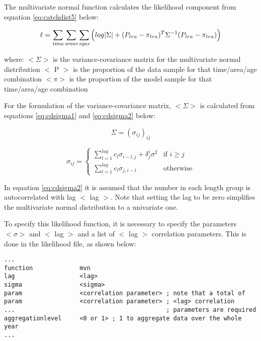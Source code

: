 \documentclass[]{book}
\begin{document}
The multivariate normal function calculates the likelihood component
from equation \eqref{eq:catchdist5} below:

\begin{equation}
\label{eq:catchdist5}
\ell = \sum_{\it time}\sum_{\it areas}\sum_{\it ages} \Big( log|\Sigma| + (P_{tra} - \pi_{tra})^T \Sigma^{-1}(P_{tra} - \pi_{tra}) \Big)\end{equation}

where: \(<\Sigma>\) is the variance-covariance matrix for the multivariate
normal distribution \(<\) P \(>\) is the proportion of the data sample for
that time/area/age combination \(<\pi>\) is the proportion of the model
sample for that time/area/age combination

For the formulation of the variance-covariance matrix, \(<\Sigma>\) is
calculated from equations
\eqref{eq:cdsigma1} and
\eqref{eq:cdsigma2} below:

\begin{equation}
\label{eq:cdsigma1}
\Sigma = (\sigma_{ij})_{ij}\end{equation}

\begin{equation}
\label{eq:cdsigma2}
\sigma_{ij} =
\begin{cases}
\displaystyle \sum^{lag}_{l=1} c_l \sigma_{i-l,j} + \delta^i_{j} \sigma^2 & \textrm{if $i \geq j$} \\
\displaystyle \sum^{lag}_{l=1} c_l \sigma_{j,i-l} & \textrm{otherwise}
\end{cases}\end{equation}

In equation \eqref{eq:cdsigma2} it is assumed that the number in each length
group is autocorrelated with lag \(<\) lag \(>\). Note that setting the lag
to be zero simplifies the multivariate normal distribution to a
univariate one.

To specify this likelihood function, it is necessary to specify the
parameters \(<\sigma>\) and \(<\) lag \(>\) and a list of \(<\) lag \(>\)
correlation parameters. This is done in the likelihood file, as shown
below:

\begin{verbatim}
...
function             mvn
lag                  <lag>
sigma                <sigma>
param                <correlation parameter> ; note that a total of
param                <correlation parameter> ; <lag> correlation
...                                          ; parameters are required
aggregationlevel     <0 or 1> ; 1 to aggregate data over the whole year
...
\end{verbatim}
\end{document}
